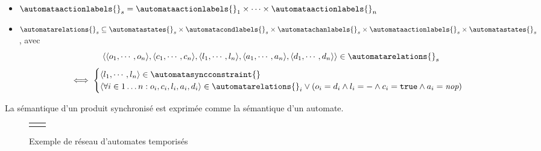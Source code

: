 \begin{definition}
\begin{itemize}
\item $\automataactionlabels{}_s =
   \automataactionlabels{}_1 \times \cdots \times \automataactionlabels{}_n$
\item
   $\automatarelations{}_s \subseteq
      \automatastates{}_s
      \times \automatacondlabels{}_s
      \times \automatachanlabels{}_s
      \times \automataactionlabels{}_s
      \times \automatastates{}_s
   $, avec
   $$
   \langle
      \langle o_1, \cdots, o_n \rangle,
      \langle c_1, \cdots, c_n \rangle,
      \langle l_1, \cdots, l_n \rangle,
      \langle a_1, \cdots, a_n \rangle,
      \langle d_1, \cdots, d_n \rangle
   \rangle \in \automatarelations{}_s
   $$
   $$
   \iff
   \begin{cases}
      \langle l_1, \cdots, l_n \rangle \in \automatasyncconstraint{}\\
      \langle
         \forall i \in 1\ldots n :
         o_i, c_i, l_i, a_i, d_i \rangle \in \automatarelations{}_i
         \lor (o_i = d_i \land l_i = - \land c_i = \texttt{true} \land a_i =
         \textit{nop})
   \end{cases}
   $$
\end{itemize}
La sémantique d'un produit synchronisé est exprimée comme la sémantique d'un automate.
\end{definition}

\begin{figure}[hbt]
   \centering
   \begin{tabular}{cc}
    &
   
   \end{tabular}
   \caption{Exemple de réseau d'automates temporisés}
   \label{fr:fig:timed_automata_urgent_comitted}
\end{figure}

